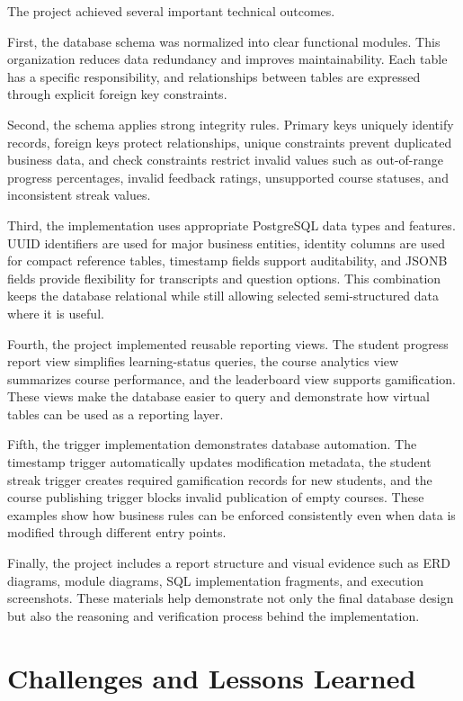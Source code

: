 The project achieved several important technical outcomes.

First, the database schema was normalized into clear functional modules. This organization reduces data redundancy and improves maintainability. Each table has a specific responsibility, and relationships between tables are expressed through explicit foreign key constraints.

Second, the schema applies strong integrity rules. Primary keys uniquely identify records, foreign keys protect relationships, unique constraints prevent duplicated business data, and check constraints restrict invalid values such as out-of-range progress percentages, invalid feedback ratings, unsupported course statuses, and inconsistent streak values.

Third, the implementation uses appropriate PostgreSQL data types and features. UUID identifiers are used for major business entities, identity columns are used for compact reference tables, timestamp fields support auditability, and JSONB fields provide flexibility for transcripts and question options. This combination keeps the database relational while still allowing selected semi-structured data where it is useful.

Fourth, the project implemented reusable reporting views. The student progress report view simplifies learning-status queries, the course analytics view summarizes course performance, and the leaderboard view supports gamification. These views make the database easier to query and demonstrate how virtual tables can be used as a reporting layer.

Fifth, the trigger implementation demonstrates database automation. The timestamp trigger automatically updates modification metadata, the student streak trigger creates required gamification records for new students, and the course publishing trigger blocks invalid publication of empty courses. These examples show how business rules can be enforced consistently even when data is modified through different entry points.

Finally, the project includes a report structure and visual evidence such as ERD diagrams, module diagrams, SQL implementation fragments, and execution screenshots. These materials help demonstrate not only the final database design but also the reasoning and verification process behind the implementation.

\section{Challenges and Lessons Learned}

